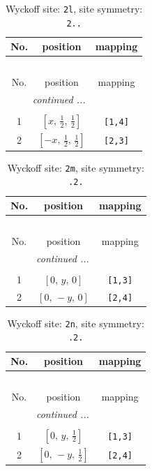 \documentclass[fleqn,8pt]{jsarticle}
\begin{document}
\renewcommand{\arraystretch}{1.2}
\begin{longtable}{ccc}
\caption{Wyckoff site: {\tt 2l}, site symmetry: {\tt 2..}}
 \\
 \hline \hline
No. & position & mapping \\ \hline \endfirsthead

\multicolumn{2}{l}{\tablename\ \thetable{}} \\
 \hline \hline
No. & position & mapping \\ \hline \endhead

 \hline \hline
\multicolumn{2}{r}{\footnotesize\it continued ...} \\ \endfoot

 \hline \hline
\multicolumn{2}{r}{} \\ \endlastfoot

1 & $\left[ x,\, \frac{1}{2},\, \frac{1}{2} \right]$ & {\tt [1,4]} \\ \hline
2 & $\left[ - x,\, \frac{1}{2},\, \frac{1}{2} \right]$ & {\tt [2,3]} \\
\end{longtable}
\renewcommand{\arraystretch}{1.2}
\begin{longtable}{ccc}
\caption{Wyckoff site: {\tt 2m}, site symmetry: {\tt .2.}}
 \\
 \hline \hline
No. & position & mapping \\ \hline \endfirsthead

\multicolumn{2}{l}{\tablename\ \thetable{}} \\
 \hline \hline
No. & position & mapping \\ \hline \endhead

 \hline \hline
\multicolumn{2}{r}{\footnotesize\it continued ...} \\ \endfoot

 \hline \hline
\multicolumn{2}{r}{} \\ \endlastfoot

1 & $\left[ 0,\, y,\, 0 \right]$ & {\tt [1,3]} \\ \hline
2 & $\left[ 0,\, - y,\, 0 \right]$ & {\tt [2,4]} \\
\end{longtable}
\renewcommand{\arraystretch}{1.2}
\begin{longtable}{ccc}
\caption{Wyckoff site: {\tt 2n}, site symmetry: {\tt .2.}}
 \\
 \hline \hline
No. & position & mapping \\ \hline \endfirsthead

\multicolumn{2}{l}{\tablename\ \thetable{}} \\
 \hline \hline
No. & position & mapping \\ \hline \endhead

 \hline \hline
\multicolumn{2}{r}{\footnotesize\it continued ...} \\ \endfoot

 \hline \hline
\multicolumn{2}{r}{} \\ \endlastfoot

1 & $\left[ 0,\, y,\, \frac{1}{2} \right]$ & {\tt [1,3]} \\ \hline
2 & $\left[ 0,\, - y,\, \frac{1}{2} \right]$ & {\tt [2,4]} \\
\end{longtable}
\end{document}
